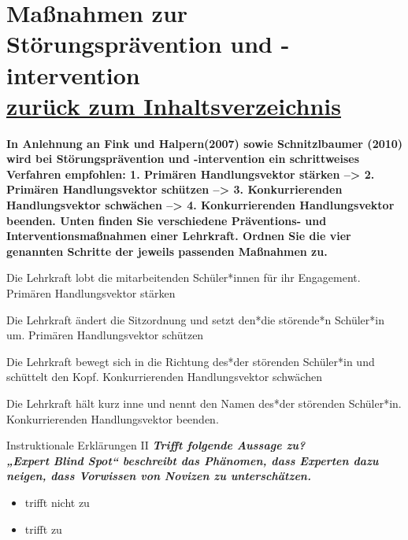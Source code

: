 \documentclass[a4paper]{article}
\newcommand{\TheCorrectAnswer}{\rlap{\hspace{1.4pt}$\bullet$}{$\ocircle$}}
\newcommand{\TheWrongAnswer}{$\ocircle$}
\newcommand{\defaultCorrect}{\ding{51}}
\newcommand{\defaultWrong}{\ding{55}}
\newcommand{\defaultUnsure}{\textbf{?}}
\newenvironment{answers}{\begin{itemize}}{\end{itemize}}
\newcommand{\correct}{\defaultCorrect}
\newcommand{\wrong}{\defaultWrong}
\newcommand{\unsure}{\defaultUnsure}
\newenvironment{question}[2]{%
    \section[#1 \normalfont(#2)]{#1\\\small\normalfont\hyperlink{tableofcontents}{zurück zum Inhaltsverzeichnis}}%
}{%
    \newpage%
}
\newcommand{\questiontext}[1]{\textbf{#1}}
\newcommand{\assignment}[1]{\textbf{\textit{#1}}\newline}
\newenvironment{single-choice}[1]{%
    \begin{question}{#1}{Single Choice}%
    \renewenvironment{answers}{%
        \begin{single-choice-list}}{\end{single-choice-list}%
    }%
    \renewcommand{\correct}{\TheCorrectAnswer}%
    \renewcommand{\wrong}{\TheWrongAnswer}%
    \renewcommand{\unsure}{TheUnsureAnswer}%
}{%
    \renewcommand{\correct}{\defaultCorrect}%
    \renewcommand{\wrong}{\defaultWrong}%
    \renewcommand{\unsure}{\defaultUnsure}%
    \end{question}%
}
\newenvironment{mapping}[1]{%
    \begin{question}{#1}{Zuordnungsaufgabe}%
    \newcommand{\ismappedto}{\tcblower}%
    \newenvironment{answer}{\begin{mapping-box}}{\end{mapping-box}}%
}{%
    \end{question}%
}
\begin{document}
\begin{mapping}{Maßnahmen zur Störungsprävention und -intervention}
    \questiontext{In Anlehnung an Fink und Halpern(2007) sowie Schnitzlbaumer (2010) wird bei Störungsprävention und -intervention ein schrittweises Verfahren empfohlen: 1. Primären Handlungsvektor stärken --> 2. Primären Handlungsvektor schützen --> 3. Konkurrierenden Handlungsvektor schwächen --> 4. Konkurrierenden Handlungsvektor beenden. Unten finden Sie verschiedene Präventions- und Interventionsmaßnahmen einer Lehrkraft. Ordnen Sie die vier genannten Schritte der jeweils passenden Maßnahmen zu.}
    \begin{answer}
        Die Lehrkraft lobt die mitarbeitenden Schüler*innen für ihr Engagement.
        \ismappedto
        Primären Handlungsvektor stärken
    \end{answer}
    \begin{answer}
        Die Lehrkraft ändert die Sitzordnung und setzt den*die störende*n Schüler*in um.
        \ismappedto
        Primären Handlungsvektor schützen
    \end{answer}
    \begin{answer}
        Die Lehrkraft bewegt sich in die Richtung des*der störenden Schüler*in und schüttelt den Kopf.
        \ismappedto
        Konkurrierenden Handlungsvektor schwächen
    \end{answer}
    \begin{answer}
        Die Lehrkraft hält kurz inne und nennt den Namen des*der störenden Schüler*in.
        \ismappedto
        Konkurrierenden Handlungsvektor beenden.
    \end{answer}
\end{mapping}

\begin{single-choice}{Instruktionale Erklärungen II}
    \assignment{Trifft folgende Aussage zu?\\„Expert Blind Spot“ beschreibt das Phänomen, dass Experten dazu neigen, dass Vorwissen von Novizen zu unterschätzen.}
    \begin{answers}
        \item[\correct] trifft nicht zu
        \item[\wrong] trifft zu
    \end{answers}
\end{single-choice}
\end{document}
